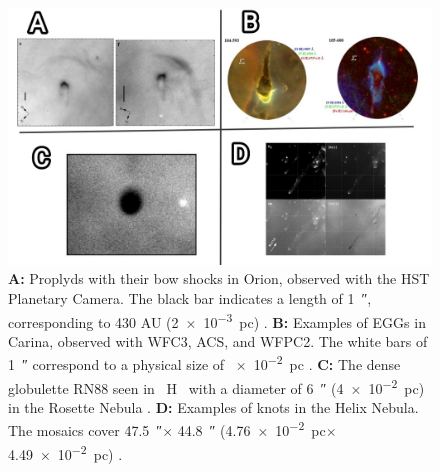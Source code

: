\documentclass{book}
\begin{document}
\begin{figure}[htb]
    \centering
    \includegraphics[width=1 \textwidth]{images Chapter 1/C1_Globulettes.jpg}
    \caption{\textbf{A:} Proplyds with their bow shocks in Orion,
      observed with the HST Planetary Camera. The black bar indicates
      a length of \SI{1}{\arcsecond}, corresponding to 430 AU
      (\SI{2e-3}{pc}) \citep{Garcia-Arredondo:2001}. \textbf{B:}
      Examples of EGGs in Carina, observed with WFC3, ACS, and WFPC2.
      The white bars of \SI{1}{\arcsecond} correspond to a physical
      size of \SI{e-2}{pc} \citep{Mesa-Delgado:2016}. \textbf{C:} The
      dense globulette RN88 seen in \SI{}{H\alpha} with a diameter of
      \SI{6}{\arcsecond} (\SI{4e-2}{pc}) in the Rosette Nebula
      \citep{GFGahm:2013}. \textbf{D:} Examples of knots in the Helix
      Nebula. The mosaics cover \SI{47.5}{\arcsecond}$\times$
      \SI{44.8}{\arcsecond} (\SI{4.76e-2}{pc}$\times$\SI{4.49e-2}{pc})
      \citep{O'Dell:2007}.}
    \label{fig:nudos}
\end{figure}


\end{document}
